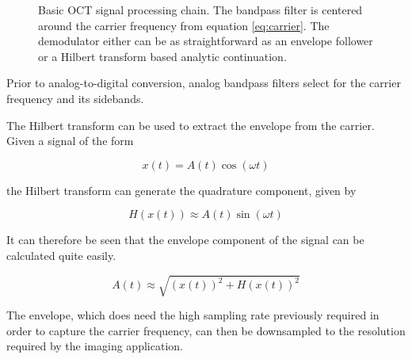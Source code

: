 
\begin{figure}[h!]
  \centering
{}
\caption{Basic OCT signal processing chain. The bandpass filter is centered around the carrier frequency from equation \ref{eq:carrier}. The demodulator either can be as straightforward as an envelope follower or a Hilbert transform based analytic continuation.}
\end{figure}

Prior to analog-to-digital conversion, analog bandpass filters select for the carrier frequency and its sidebands.

The Hilbert transform can be used to extract the envelope from the carrier. Given a signal of the form

\begin{equation}
x(t) = A(t)\cos{(\omega t)}
\end{equation}

the Hilbert transform can generate the quadrature component, given by

\begin{equation}
H(x(t)) \approx A(t) \sin{(\omega t)}
\end{equation}

It can therefore be seen that the envelope component of the signal can be calculated quite easily.

\begin{equation}
A(t) \approx \sqrt{(x(t))^2 + H(x(t))^2}
\end{equation}

The envelope, which does need the high sampling rate previously required in order to capture the carrier frequency, can then be downsampled to the resolution required by the imaging application.

